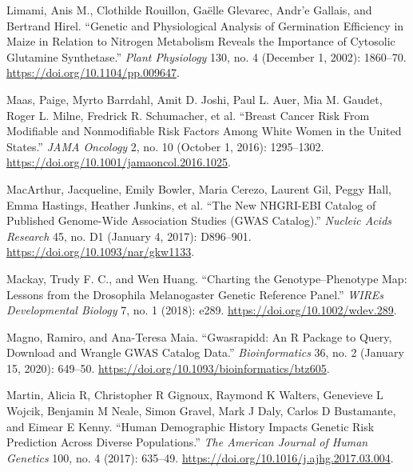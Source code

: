 \documentclass[
]{book}
\newlength{\cslhangindent}
\newlength{\cslentryspacingunit} %
\newenvironment{CSLReferences}[2] %
 {%
  \setlength{\parindent}{0pt}
  \ifodd #1
  \let\oldpar\par
  \def\par{\hangindent=\cslhangindent\oldpar}
  \fi
  \setlength{\parskip}{#2\cslentryspacingunit}
 }%
 {}
\begin{document}
\begin{CSLReferences}{1}{0}
\leavevmode{}%
Limami, Anis M., Clothilde Rouillon, Gaëlle Glevarec, Andr'e Gallais, and Bertrand Hirel. {``Genetic and {Physiological Analysis} of {Germination Efficiency} in {Maize} in {Relation} to {Nitrogen Metabolism Reveals} the {Importance} of {Cytosolic Glutamine Synthetase}.''} \emph{Plant Physiology} 130, no. 4 (December 1, 2002): 1860--70. \url{https://doi.org/10.1104/pp.009647}.

\leavevmode{}%
Maas, Paige, Myrto Barrdahl, Amit D. Joshi, Paul L. Auer, Mia M. Gaudet, Roger L. Milne, Fredrick R. Schumacher, et al. {``Breast {Cancer Risk From Modifiable} and {Nonmodifiable Risk Factors Among White Women} in the {United States}.''} \emph{JAMA Oncology} 2, no. 10 (October 1, 2016): 1295--1302. \url{https://doi.org/10.1001/jamaoncol.2016.1025}.

\leavevmode{}%
MacArthur, Jacqueline, Emily Bowler, Maria Cerezo, Laurent Gil, Peggy Hall, Emma Hastings, Heather Junkins, et al. {``The New {NHGRI-EBI Catalog} of Published Genome-Wide Association Studies ({GWAS Catalog}).''} \emph{Nucleic Acids Research} 45, no. D1 (January 4, 2017): D896--901. \url{https://doi.org/10.1093/nar/gkw1133}.

\leavevmode{}%
Mackay, Trudy F. C., and Wen Huang. {``Charting the Genotype--Phenotype Map: Lessons from the {Drosophila} Melanogaster {Genetic Reference Panel}.''} \emph{WIREs Developmental Biology} 7, no. 1 (2018): e289. \url{https://doi.org/10.1002/wdev.289}.

\leavevmode{}%
Magno, Ramiro, and Ana-Teresa Maia. {``Gwasrapidd: An {R} Package to Query, Download and Wrangle {GWAS} Catalog Data.''} \emph{Bioinformatics} 36, no. 2 (January 15, 2020): 649--50. \url{https://doi.org/10.1093/bioinformatics/btz605}.

\leavevmode{}%
Martin, Alicia R, Christopher R Gignoux, Raymond K Walters, Genevieve L Wojcik, Benjamin M Neale, Simon Gravel, Mark J Daly, Carlos D Bustamante, and Eimear E Kenny. {``Human Demographic History Impacts Genetic Risk Prediction Across Diverse Populations.''} \emph{The American Journal of Human Genetics} 100, no. 4 (2017): 635--49. \url{https://doi.org/10.1016/j.ajhg.2017.03.004}.


\end{CSLReferences}
\end{document}
